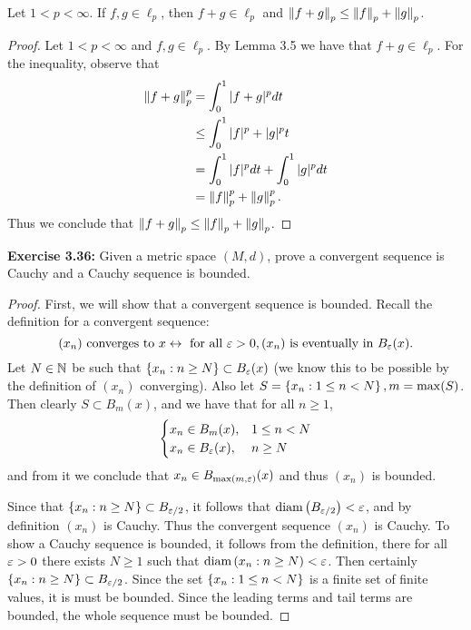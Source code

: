 \documentclass{exam}
\begin{document}
\begin{questions}
    \setcounter{lemma}{7}
    \noqed
    \begin{theorem}\label{thm:main}
        Let $1 < p < \infty$. If $f, g\in \ell_p$, then $f + g\in \ell_p$ and $\left\| f + g \right\|_p \leq \left\| f \right\|_p + \left\| g \right\|_p$.
    \end{theorem}
    \yesqed
    \begin{proof}
        Let $1 < p < \infty$ and $f, g\in \ell_p$. By Lemma 3.5 we have that $f + g\in\ell_p$. For the inequality,
        observe that
        \begin{align*}
            \left\| f + g \right\|_p^p &= \int_0^1 |f + g|^p dt \\
            &\leq \int_0^1 |f|^p + |g|^p t \\
            &= \int_0^1 |f|^p dt + \int_0^1 |g|^p dt \\
            &= \left\| f \right\|_p^p + \left\| g \right\|_p^p.
        \end{align*}
        Thus we conclude that $\left\| f + g \right\|_p \leq \left\| f \right\|_p + \left\| g \right\|_p$.

    \end{proof}


    \newpage
    \question \textbf{Exercise 3.36:} Given a metric space $(M, d)$, prove a convergent sequence is Cauchy and a Cauchy sequence is bounded.
    \begin{proof}
        First, we will show that a convergent sequence is bounded. Recall the definition for a convergent sequence:
        $$(x_n)\text{ converges to } x \leftrightarrow \text{ for all }\varepsilon > 0, (x_n) \text{ is eventually in } B_\varepsilon (x).$$
        Let $N\in\mathbb {N}$ be such that $\left \{ x_n : n \geq N \right \} \subset B_\varepsilon (x)$ (we know this to be possible by the definition
        of $(x_n)$ converging). Also let $S = \left \{ x_n : 1 \leq n < N \right \}, m = \max (S)$. Then clearly $S \subset B_m(x)$, and we have 
        that for all $n\geq 1$,
        $$\begin{cases}
            x_n \in B_m(x), & 1 \leq n < N \\
            x_n \in B_\varepsilon(x), &n \geq N
        \end{cases}$$
        and from it we conclude that $x_n \in B_{\max (m, \varepsilon)}(x)$ and thus $(x_n)$ is bounded.

        Since that $\left \{ x_n : n \geq N \right \} \subset B_{\varepsilon / 2}$, it follows that $\text{diam}\left( B_{\varepsilon / 2} \right) < \varepsilon$, and by definition
        $(x_n)$ is Cauchy. Thus the convergent sequence $(x_n)$ is Cauchy. To show a Cauchy sequence is bounded, it follows from
        the definition, there for all $\varepsilon > 0$ there exists $N\geq 1$ such that $\text{diam}\left( x_n : n \geq N \right) < \varepsilon$. Then certainly
        $\left \{ x_n : n\geq N \right \} \subset B_{\varepsilon / 2}$. Since the set $\left \{ x_n : 1 \leq n < N \right \}$ is a finite set of finite values, it 
        is must be bounded. Since the leading terms and tail terms are bounded, the whole sequence must be bounded.


\end{proof}
\end{questions}
\end{document}
